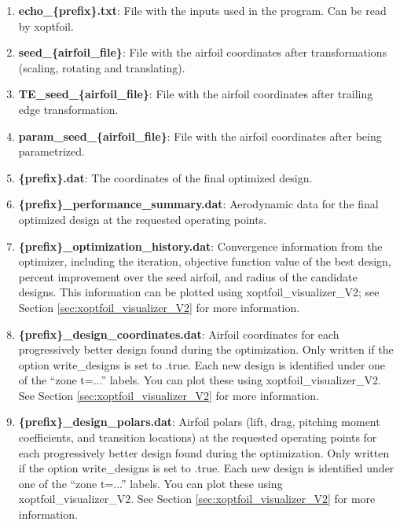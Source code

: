 \documentclass[11pt]{article}
\begin{document}
\begin{enumerate}
\item{\textbf{echo\_\{prefix\}.txt}: File with the inputs used in the program. Can be read by xoptfoil.}

\item{\textbf{seed\_\{airfoil\_file\}}: File with the airfoil coordinates after transformations (scaling, rotating and translating).}

\item{\textbf{TE\_seed\_\{airfoil\_file\}}: File with the airfoil coordinates after trailing edge transformation.}

\item{\textbf{param\_seed\_\{airfoil\_file\}}: File with the airfoil coordinates after being parametrized.}


\item{\textbf{\{prefix\}.dat}: The coordinates of the final optimized design.}

\item{\textbf{\{prefix\}\_performance\_summary.dat}: Aerodynamic data for the final optimized
design at the requested operating points.}

\item{\textbf{\{prefix\}\_optimization\_history.dat}: Convergence information from the optimizer,
	including the iteration, objective function value of the best design, percent improvement
	over the seed airfoil, and radius of the candidate designs. This information can be
	plotted using xoptfoil\_visualizer\_V2; see Section \ref{sec:xoptfoil_visualizer_V2} for more
	information.}

\item{\textbf{\{prefix\}\_design\_coordinates.dat}: Airfoil coordinates for each
progressively better design found during the optimization.  Only written if the option
write\_designs is set to .true.  Each new design is identified under one of the ``zone
t=...'' labels.  You can plot these using xoptfoil\_visualizer\_V2. See Section 
\ref{sec:xoptfoil_visualizer_V2} for more information.}

\item{\textbf{\{prefix\}\_design\_polars.dat}: Airfoil polars (lift, drag, pitching
moment coefficients, and transition locations) at
the requested operating points for each progressively better design found during the 
optimization.  Only written if the option write\_designs is set to .true.  Each new design
is identified under one of the ``zone t=...'' labels.  You can plot these using 
xoptfoil\_visualizer\_V2. See Section \ref{sec:xoptfoil_visualizer_V2} for more information.}


\end{enumerate}
\end{document}
